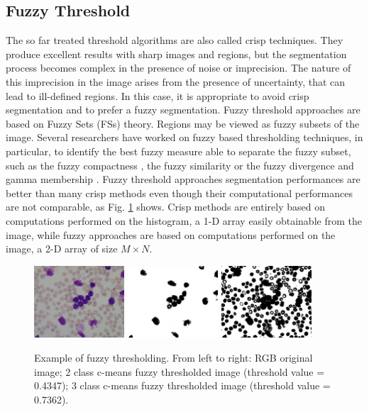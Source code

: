 \subsection{Fuzzy Threshold} %
The so far treated threshold algorithms are also called crisp techniques. They produce excellent results with sharp images and regions, but the segmentation process becomes complex in the presence of noise or imprecision. The nature of this imprecision in the image arises from the presence of uncertainty, that can lead to ill-defined regions. In this case, it is appropriate to avoid crisp segmentation and to prefer a fuzzy segmentation. Fuzzy threshold approaches are based on Fuzzy Sets (\acs{FS}s) theory. Regions may be viewed as fuzzy subsets of the image. Several researchers have worked on fuzzy based thresholding techniques, in particular, to identify the best fuzzy measure able to separate the fuzzy subset, such as the fuzzy compactness \cite{Pal}, the fuzzy similarity \cite{Ramar} or the fuzzy divergence and gamma membership \cite{Cha03, MeloP}.
Fuzzy threshold approaches segmentation performances are better than many crisp methods even though their computational performances are not comparable, as Fig. \ref{fig:fuzzy} shows. Crisp methods are entirely based on computations performed on the histogram, a 1-D array easily obtainable from the image, while fuzzy approaches are based on computations performed on the image, a 2-D array of size $M \times N$.

\begin{figure}[h]
	\centering
	\includegraphics[width=0.3\textwidth]{images/figcs_rgb}
	\includegraphics[width=0.3\textwidth]{images/fig_fuzzy1}
	\includegraphics[width=0.3\textwidth]{images/fig_fuzzy2}
	\caption[Example of fuzzy thresholding.]{\label{fig:fuzzy}Example of fuzzy thresholding. From left to right: RGB original image; 2 class c-means fuzzy thresholded image (threshold value = 0.4347); 3 class c-means fuzzy thresholded image (threshold value = 0.7362).}
\end{figure}


